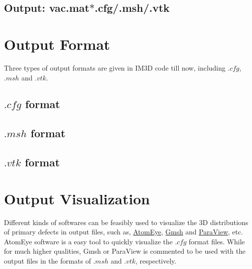 \subsection{Output: vac.mat$*$.cfg/.msh/.vtk}


\section{Output Format}

Three types of output formats are given in IM3D code till now, including $.cfg$, $.msh$ and $.vtk$.

\subsection{$.cfg$ format}


\subsection{$.msh$ format}


\subsection{$.vtk$ format}



\section{Output Visualization}

Different kinds of softwares can be feasibly used to visualize the 3D distributions of primary defects in output files, such as, \href{http://li.mit.edu/Archive/Graphics/A/}{AtomEye}, \href{http://geuz.org/gmsh/}{Gmsh} and \href{http://www.paraview.org/}{ParaView}, etc. AtomEye software is a easy tool to quickly visualize the $.cfg$ format files. While for much higher qualities, Gmsh or ParaView is commented to be used with the output files in the formats of $.msh$ and $.vtk$, respectively.


